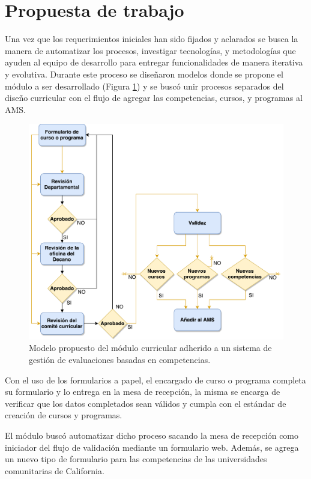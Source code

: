 \section{Propuesta de trabajo} \label{propuesta_de_trabajo}
Una vez que los requerimientos iniciales han sido fijados y aclarados se busca la manera de automatizar los procesos, investigar tecnologías, y metodologías que ayuden al equipo de desarrollo para entregar funcionalidades de manera iterativa y evolutiva. Durante este proceso se diseñaron modelos donde se propone el módulo a ser desarrollado (Figura \ref{curriculum_model}) y se buscó unir procesos separados del diseño curricular con el flujo de agregar las competencias, cursos, y programas al AMS.

\begin{figure}[]
\centering
\includegraphics[scale=0.4]{img/curriculum_model}
\caption{Modelo propuesto del módulo curricular adherido a un sistema de gestión de evaluaciones basadas en competencias.}
  \label{curriculum_model}
\end{figure}

Con el uso de los formularios a papel, el encargado de curso o programa completa su formulario y lo entrega en la mesa de recepción, la misma se encarga de verificar que los datos completados sean válidos y cumpla con el estándar de creación de cursos y programas. 

El módulo buscó automatizar dicho proceso sacando la mesa de recepción como iniciador del flujo de validación mediante un formulario web. Además, se agrega un nuevo tipo de formulario para las competencias de las universidades comunitarias de California.

